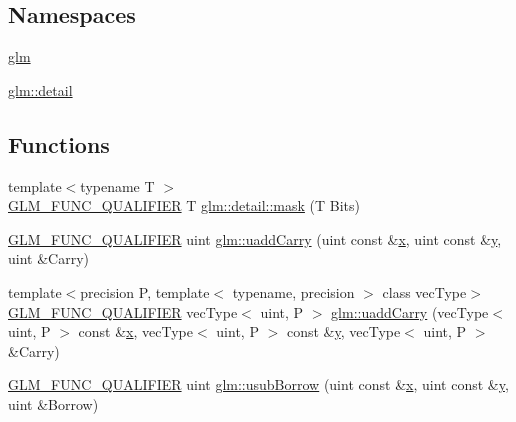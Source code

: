 \subsection*{Namespaces}
\begin{DoxyCompactItemize}
\item 
 \mbox{\hyperlink{namespaceglm}{glm}}
\item 
 \mbox{\hyperlink{namespaceglm_1_1detail}{glm\+::detail}}
\end{DoxyCompactItemize}
\subsection*{Functions}
\begin{DoxyCompactItemize}
\item 
{\footnotesize template$<$typename T $>$ }\\\mbox{\hyperlink{setup_8hpp_a33fdea6f91c5f834105f7415e2a64407}{G\+L\+M\+\_\+\+F\+U\+N\+C\+\_\+\+Q\+U\+A\+L\+I\+F\+I\+ER}} T \mbox{\hyperlink{namespaceglm_1_1detail_a048ad00e8777f9f3ebe185ed48857df0}{glm\+::detail\+::mask}} (T Bits)
\item 
\mbox{\hyperlink{setup_8hpp_a33fdea6f91c5f834105f7415e2a64407}{G\+L\+M\+\_\+\+F\+U\+N\+C\+\_\+\+Q\+U\+A\+L\+I\+F\+I\+ER}} uint \mbox{\hyperlink{namespaceglm_a541d30d3289d3a3da69edec69df11a04}{glm\+::uadd\+Carry}} (uint const \&\mbox{\hyperlink{glad_8h_a92d0386e5c19fb81ea88c9f99644ab1d}{x}}, uint const \&\mbox{\hyperlink{glad_8h_a66ddd433d2cacfe27f5906b7e86faeed}{y}}, uint \&Carry)
\item 
{\footnotesize template$<$precision P, template$<$ typename, precision $>$ class vec\+Type$>$ }\\\mbox{\hyperlink{setup_8hpp_a33fdea6f91c5f834105f7415e2a64407}{G\+L\+M\+\_\+\+F\+U\+N\+C\+\_\+\+Q\+U\+A\+L\+I\+F\+I\+ER}} vec\+Type$<$ uint, P $>$ \mbox{\hyperlink{group__core__func__integer_ga2fc1a46e7b7e9fbbd8fa444fbacaa2aa}{glm\+::uadd\+Carry}} (vec\+Type$<$ uint, P $>$ const \&\mbox{\hyperlink{glad_8h_a92d0386e5c19fb81ea88c9f99644ab1d}{x}}, vec\+Type$<$ uint, P $>$ const \&\mbox{\hyperlink{glad_8h_a66ddd433d2cacfe27f5906b7e86faeed}{y}}, vec\+Type$<$ uint, P $>$ \&Carry)
\item 
\mbox{\hyperlink{setup_8hpp_a33fdea6f91c5f834105f7415e2a64407}{G\+L\+M\+\_\+\+F\+U\+N\+C\+\_\+\+Q\+U\+A\+L\+I\+F\+I\+ER}} uint \mbox{\hyperlink{namespaceglm_ac7a75ea277a43b855920597adeebb2e3}{glm\+::usub\+Borrow}} (uint const \&\mbox{\hyperlink{glad_8h_a92d0386e5c19fb81ea88c9f99644ab1d}{x}}, uint const \&\mbox{\hyperlink{glad_8h_a66ddd433d2cacfe27f5906b7e86faeed}{y}}, uint \&Borrow)

\end{DoxyCompactItemize}
